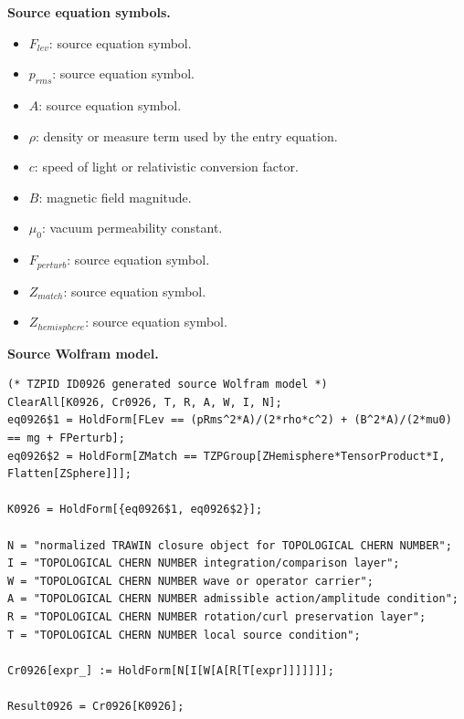 \begin{minipage}[t]{0.49\linewidth}
\begingroup
\small
\raggedright
\textbf{Source equation symbols.}\par
\begin{itemize}[leftmargin=1.35em,itemsep=1pt,topsep=1pt,parsep=0pt]
    \item $F_{lev}$: source equation symbol.
    \item $p_{rms}$: source equation symbol.
    \item $A$: source equation symbol.
    \item $\rho$: density or measure term used by the entry equation.
    \item $c$: speed of light or relativistic conversion factor.
    \item $B$: magnetic field magnitude.
    \item $\mu_0$: vacuum permeability constant.
    \item $F_{perturb}$: source equation symbol.
    \item $Z_{match}$: source equation symbol.
    \item $Z_{hemisphere}$: source equation symbol.
\end{itemize}
\endgroup
\end{minipage}\hfill
\begin{minipage}[t]{0.47\linewidth}
\begingroup
\scriptsize
\raggedright
\textbf{Source Wolfram model.}\par
\begin{Verbatim}[fontsize=\tiny,breaklines=true,breakanywhere=true]
(* TZPID ID0926 generated source Wolfram model *)
ClearAll[K0926, Cr0926, T, R, A, W, I, N];
eq0926$1 = HoldForm[FLev == (pRms^2*A)/(2*rho*c^2) + (B^2*A)/(2*mu0) == mg + FPerturb];
eq0926$2 = HoldForm[ZMatch == TZPGroup[ZHemisphere*TensorProduct*I, Flatten[ZSphere]]];

K0926 = HoldForm[{eq0926$1, eq0926$2}];

N = "normalized TRAWIN closure object for TOPOLOGICAL CHERN NUMBER";
I = "TOPOLOGICAL CHERN NUMBER integration/comparison layer";
W = "TOPOLOGICAL CHERN NUMBER wave or operator carrier";
A = "TOPOLOGICAL CHERN NUMBER admissible action/amplitude condition";
R = "TOPOLOGICAL CHERN NUMBER rotation/curl preservation layer";
T = "TOPOLOGICAL CHERN NUMBER local source condition";

Cr0926[expr_] := HoldForm[N[I[W[A[R[T[expr]]]]]]];

Result0926 = Cr0926[K0926];
\end{Verbatim}
\endgroup
\end{minipage}

